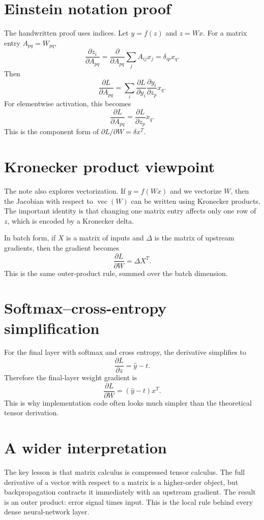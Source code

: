 \section{Einstein notation proof}

The handwritten proof uses indices.  Let $y=f(z)$ and $z=Wx$.  For a matrix entry $A_{pq}=W_{pq}$,
\[
  \frac{\partial z_i}{\partial A_{pq}}
  =\frac{\partial}{\partial A_{pq}}
  \sum_j A_{ij}x_j
  =\delta_{ip}x_q.
\]
Then
\[
  \frac{\partial L}{\partial A_{pq} }
  =\sum_i \frac{\partial L}{\partial y_i}
  \frac{\partial y_i}{\partial z_p}x_q.
\]
For elementwise activation, this becomes
\[
  \frac{\partial L}{\partial A_{pq}}
  =\frac{\partial L}{\partial z_p}x_q.
\]
This is the component form of $\partial L/\partial W=\delta x^T$.

\section{Kronecker product viewpoint}

The note also explores vectorization.  If $y=f(Wx)$ and we vectorize $W$, then the Jacobian with respect to $\operatorname{vec}(W)$ can be written using Kronecker products.  The important identity is that changing one matrix entry affects only one row of $z$, which is encoded by a Kronecker delta.

In batch form, if $X$ is a matrix of inputs and $\Delta$ is the matrix of upstream gradients, then the gradient becomes
\[
  \frac{\partial L}{\partial W}=\Delta X^T.
\]
This is the same outer-product rule, summed over the batch dimension.

\section{Softmax--cross-entropy simplification}

For the final layer with softmax and cross entropy, the derivative simplifies to
\[
  \frac{\partial L}{\partial z}=\hat y-t.
\]
Therefore the final-layer weight gradient is
\[
  \frac{\partial L}{\partial W}=(\hat y-t)x^T.
\]
This is why implementation code often looks much simpler than the theoretical tensor derivation.

\section{A wider interpretation}

The key lesson is that matrix calculus is compressed tensor calculus.  The full derivative of a vector with respect to a matrix is a higher-order object, but backpropagation contracts it immediately with an upstream gradient.  The result is an outer product: error signal times input.  This is the local rule behind every dense neural-network layer.

